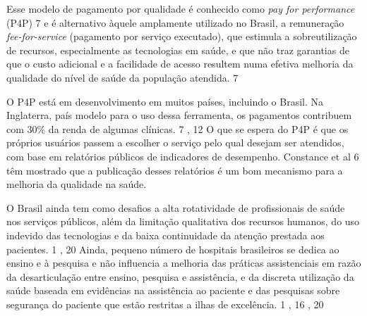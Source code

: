 \documentclass{article}
\begin{document}

Esse modelo de pagamento por qualidade é conhecido como %
\textit{pay for
          performance}
 (P4P) %
7%
 e é alternativo àquele amplamente utilizado no Brasil, a remuneração
\textit{fee-for-service}
 (pagamento por serviço executado), que estimula a
        sobreutilização de recursos, especialmente as tecnologias em saúde, e que não traz garantias
        de que o custo adicional e a facilidade de acesso resultem numa efetiva melhoria da
        qualidade do nível de saúde da população atendida. %
7%


O P4P está em desenvolvimento em muitos países, incluindo o Brasil. Na Inglaterra, país
        modelo para o uso dessa ferramenta, os pagamentos contribuem com 30\% da renda de algumas
        clínicas. %
7%
,%
12%
 O que se espera do P4P é que os próprios usuários passem a escolher o serviço pelo
        qual desejam ser atendidos, com base em relatórios públicos de indicadores de desempenho.
        Constance et al %
6%
 têm mostrado que a publicação desses relatórios é um bom mecanismo para a melhoria
        da qualidade na saúde.

O Brasil ainda tem como desafios a alta rotatividade de profissionais de saúde nos serviços
        públicos, além da limitação qualitativa dos recursos humanos, do uso indevido das
        tecnologias e da baixa continuidade da atenção prestada aos pacientes. %
1%
,%
20%
 Ainda, pequeno número de hospitais brasileiros se dedica ao ensino e à pesquisa e
        não influencia a melhoria das práticas assistenciais em razão da desarticulação entre
        ensino, pesquisa e assistência, e da discreta utilização da saúde baseada em evidências na
        assistência ao paciente e das pesquisas sobre segurança do paciente que estão restritas a
        ilhas de excelência. %
1%
,%
16%
,%
20%
\end{document}
